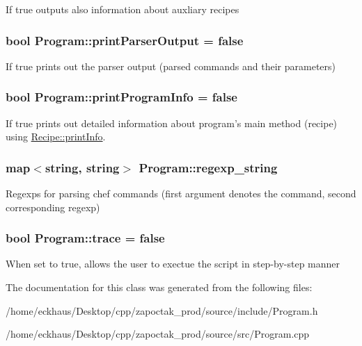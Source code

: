 If true outputs also information about auxliary recipes \hypertarget{classProgram_a3787a8712d4c75b6b5f0e81a5e4f6fdc}{
\subsubsection[{print\-Parser\-Output}]{\setlength{\rightskip}{0pt plus 5cm}bool Program\-::print\-Parser\-Output = false\hspace{0.3cm}{\ttfamily [private]}}}\label{classProgram_a3787a8712d4c75b6b5f0e81a5e4f6fdc}
If true prints out the parser output (parsed commands and their parameters) \hypertarget{classProgram_a4addd74ec821dc25e804fa2096b7fa59}{
\subsubsection[{print\-Program\-Info}]{\setlength{\rightskip}{0pt plus 5cm}bool Program\-::print\-Program\-Info = false\hspace{0.3cm}{\ttfamily [private]}}}\label{classProgram_a4addd74ec821dc25e804fa2096b7fa59}
If true prints out detailed information about program's main method (recipe) using \hyperlink{classRecipe_aa9a086810c68a0f459f3eded4fec249d}{Recipe\-::print\-Info}. \hypertarget{classProgram_af2653e6c49451f67e7365c218eaab08a}{
\subsubsection[{regexp\-\_\-string}]{\setlength{\rightskip}{0pt plus 5cm}map$<$string, string$>$ Program\-::regexp\-\_\-string\hspace{0.3cm}{\ttfamily [private]}}}\label{classProgram_af2653e6c49451f67e7365c218eaab08a}
Regexps for parsing chef commands (first argument denotes the command, second corresponding regexp) \hypertarget{classProgram_a5f4a3688d83bf77b92e294933671007c}{
\subsubsection[{trace}]{\setlength{\rightskip}{0pt plus 5cm}bool Program\-::trace = false\hspace{0.3cm}{\ttfamily [private]}}}\label{classProgram_a5f4a3688d83bf77b92e294933671007c}
When set to true, allows the user to exectue the script in step-\/by-\/step manner 

The documentation for this class was generated from the following files\-:\begin{DoxyCompactItemize}
\item 
/home/eckhaus/\-Desktop/cpp/zapoctak\-\_\-prod/source/include/Program.\-h\item 
/home/eckhaus/\-Desktop/cpp/zapoctak\-\_\-prod/source/src/Program.\-cpp\end{DoxyCompactItemize}
